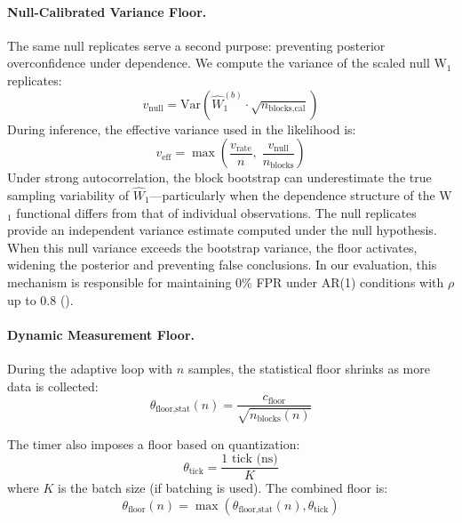 \documentclass[letterpaper,twocolumn,10pt]{article}
\begin{document}
\paragraph{Null-Calibrated Variance Floor.}
The same null replicates serve a second purpose: preventing posterior overconfidence
under dependence. We compute the variance of the scaled null W$_1$ replicates:
\begin{equation}
v_{\text{null}} = \text{Var}\!\left(\widehat{W}_1^{(b)} \cdot \sqrt{n_{\text{blocks,cal}}}\right)
\end{equation}
During inference, the effective variance used in the likelihood is:
\begin{equation}
v_{\text{eff}} = \max\!\left(\frac{v_{\text{rate}}}{n},\; \frac{v_{\text{null}}}{n_{\text{blocks}}}\right)
\end{equation}
Under strong autocorrelation, the block bootstrap can underestimate the true sampling
variability of $\widehat{W}_1$---particularly when the dependence structure of the
W$_1$ functional differs from that of individual observations. The null replicates
provide an independent variance estimate computed under the null hypothesis.
When this null variance exceeds the bootstrap variance, the floor activates,
widening the posterior and preventing false conclusions. In our evaluation,
this mechanism is responsible for maintaining 0\% FPR under AR(1) conditions
with $\rho$ up to 0.8 ().

\paragraph{Dynamic Measurement Floor.}
During the adaptive loop with $n$ samples, the statistical floor shrinks as more data is collected:
\begin{equation}
\theta_{\text{floor,stat}}(n) = \frac{c_{\text{floor}}}{\sqrt{n_{\text{blocks}}(n)}}
\end{equation}

The timer also imposes a floor based on quantization:
\begin{equation}
\theta_{\text{tick}} = \frac{\text{1 tick (ns)}}{K}
\end{equation}
where $K$ is the batch size (if batching is used). The combined floor is:
\begin{equation}
\theta_{\text{floor}}(n) = \max\!\left(\theta_{\text{floor,stat}}(n), \theta_{\text{tick}}\right)
\end{equation}
\end{document}
